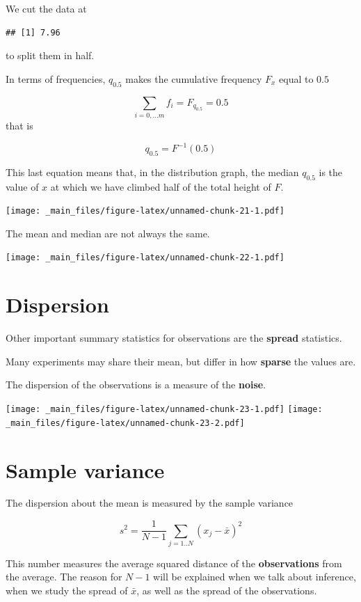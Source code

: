 \documentclass[
]{book}
\begin{document}
We cut the data at

\begin{verbatim}
## [1] 7.96
\end{verbatim}

to split them in half.

\newpage

In terms of frequencies, \(q_{0.5}\) makes the cumulative frequency \(F_x\) equal to \(0.5\)

\[\sum_{i = 0, ... m} f_i =F_{q_{0.5}}=0.5\]
that is

\[q_{ 0.5}= F^{-1}(0.5)\]

This last equation means that, in the distribution graph, the median \(q_{ 0.5}\) is the value of \(x\) at which we have climbed half of the total height of \(F\).

\texttt{[image: \_main\_files/figure-latex/unnamed-chunk-21-1.pdf]}

The mean and median are not always the same.

\texttt{[image: \_main\_files/figure-latex/unnamed-chunk-22-1.pdf]}

\hypertarget{dispersion}{%
\section{Dispersion}\label{dispersion}}

Other important summary statistics for observations are the \textbf{spread} statistics.

Many experiments may share their mean, but differ in how \textbf{sparse} the values are.

The dispersion of the observations is a measure of the \textbf{noise}.

\texttt{[image: \_main\_files/figure-latex/unnamed-chunk-23-1.pdf]} \texttt{[image: \_main\_files/figure-latex/unnamed-chunk-23-2.pdf]}

\hypertarget{sample-variance}{%
\section{Sample variance}\label{sample-variance}}

The dispersion about the mean is measured by the sample variance

\[s^2=\frac{ 1}{ N-1} \sum_{j=1..N} ( x_j -\bar{x})^2\]

This number measures the average squared distance of the \textbf{observations} from the average. The reason for \(N-1\) will be explained when we talk about inference, when we study the spread of \(\bar{x}\), as well as the spread of the observations.
\end{document}

